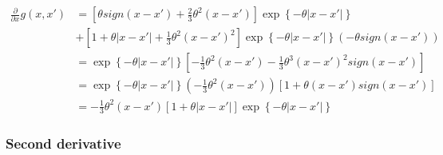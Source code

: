 \documentclass{sfuthesis}
\begin{document}
\begin{align}
\frac{\partial }{{\partial x}}g\left( {x,x'} \right) &= \left[ {\theta sign\left( {x - x'} \right) + \frac{2}{3}{\theta ^2}\left( {x - x'} \right)} \right]\exp \left\{ { - \theta \left| {x - x'} \right|} \right\}\\
 &+ \left[ {1 + \theta \left| {x - x'} \right| + \frac{1}{3}{\theta ^2}{{\left( {x - x'} \right)}^2}} \right]\exp \left\{ { - \theta \left| {x - x'} \right|} \right\}\left( { - \theta sign\left( {x - x'} \right)} \right)\\
 &= \exp \left\{ { - \theta \left| {x - x'} \right|} \right\}\left[ { - \frac{1}{3}{\theta ^2}\left( {x - x'} \right) - \frac{1}{3}{\theta ^3}{{\left( {x - x'} \right)}^2}sign\left( {x - x'} \right)} \right]\\
 &= \exp \left\{ { - \theta \left| {x - x'} \right|} \right\}\left( { - \frac{1}{3}{\theta ^2}\left( {x - x'} \right)} \right)\left[ {1 + \theta \left( {x - x'} \right)sign\left( {x - x'} \right)} \right]\\
 &=  - \frac{1}{3}{\theta ^2}\left( {x - x'} \right)\left[ {1 + \theta \left| {x - x'} \right|} \right]\exp \left\{ { - \theta \left| {x - x'} \right|} \right\}
\end{align}


\bigskip

\subsubsection{Second derivative}
\end{document}
